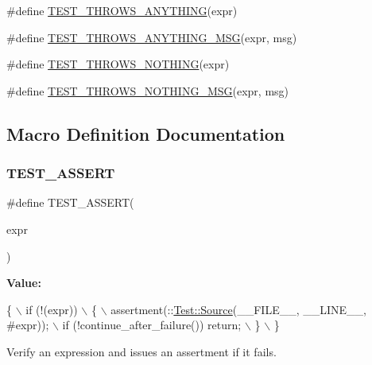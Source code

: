 \begin{DoxyCompactItemize}
\#define \mbox{\hyperlink{cpptest-assert_8h_a895af88056cd626a010136ac07b81d37}{T\+E\+S\+T\+\_\+\+T\+H\+R\+O\+W\+S\+\_\+\+A\+N\+Y\+T\+H\+I\+NG}}(expr)
\item 
\#define \mbox{\hyperlink{cpptest-assert_8h_a052597a8fd7dbc40ba350c735c4517c5}{T\+E\+S\+T\+\_\+\+T\+H\+R\+O\+W\+S\+\_\+\+A\+N\+Y\+T\+H\+I\+N\+G\+\_\+\+M\+SG}}(expr,  msg)
\item 
\#define \mbox{\hyperlink{cpptest-assert_8h_a885a5f6b6decac47414b4cc1a0a66425}{T\+E\+S\+T\+\_\+\+T\+H\+R\+O\+W\+S\+\_\+\+N\+O\+T\+H\+I\+NG}}(expr)
\item 
\#define \mbox{\hyperlink{cpptest-assert_8h_a758a47b613522a3d597c513786191ff9}{T\+E\+S\+T\+\_\+\+T\+H\+R\+O\+W\+S\+\_\+\+N\+O\+T\+H\+I\+N\+G\+\_\+\+M\+SG}}(expr,  msg)
\end{DoxyCompactItemize}


\subsection{Macro Definition Documentation}
\mbox{\label{cpptest-assert_8h_a29a763f14098f5574ae5c68291dc6ddd}} 
\subsubsection{\texorpdfstring{T\+E\+S\+T\+\_\+\+A\+S\+S\+E\+RT}{TEST\_ASSERT}}
{\footnotesize\ttfamily \#define T\+E\+S\+T\+\_\+\+A\+S\+S\+E\+RT(\begin{DoxyParamCaption}\item[{}]{expr }\end{DoxyParamCaption})}

{\bfseries Value\+:}
\begin{DoxyCode}
\{                                                               \(\backslash\)
        if (!(expr))                                                \(\backslash\)
        \{                                                           \(\backslash\)
            assertment(::\mbox{\hyperlink{class_test_1_1_source}{Test::Source}}(\_\_FILE\_\_, \_\_LINE\_\_, #expr));  \(\backslash\)
            if (!continue\_after\_failure()) return;                  \(\backslash\)
        \}                                                           \(\backslash\)
    \}
\end{DoxyCode}
Verify an expression and issues an assertment if it fails.

